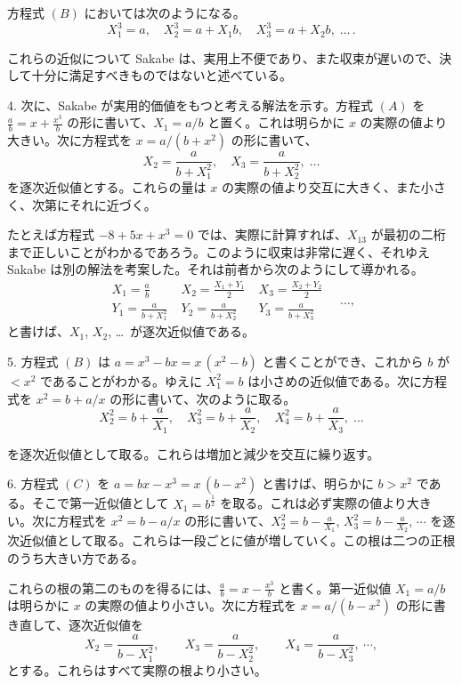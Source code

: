 \documentclass[11pt]{article}
\newcommand{\scanpage}[2]{\clearpage\setcounter{footnote}{0}\noindent{\footnotesize\color{gray}PDF #1 頁 · #2}\par\medskip}
\begin{document}
方程式 $(B)$ においては次のようになる。
\[
X_1^3 = a, \quad X_2^3 = a + X_1b, \quad X_3^3 = a + X_2b, \;\ldots\,.
\]

これらの近似について Sakabe は、実用上不便であり、また収束が遅いので、決して十分に満足すべきものではないと述べている。

4. 次に、Sakabe が実用的価値をもつと考える解法を示す。方程式 $(A)$ を $\frac{a}{b} = x + \frac{x^3}{b}$ の形に書いて、$X_1 = a/b$ と置く。これは明らかに $x$ の実際の値より大きい。次に方程式を $x = a/(b + x^2)$ の形に書いて、
\[
X_2 = \frac{a}{b + X_1^2}, \quad X_3 = \frac{a}{b + X_2^2}, \;\ldots
\]
を逐次近似値とする。これらの量は $x$ の実際の値より交互に大きく、また小さく、次第にそれに近づく。

たとえば方程式 $-8 + 5x + x^3 = 0$ では、実際に計算すれば、$X_{13}$ が最初の二桁まで正しいことがわかるであろう。このように収束は非常に遅く、それゆえ Sakabe は別の解法を考案した。それは前者から次のようにして導かれる。
\[
\begin{array}{l|l|l|}
X_1 = \frac{a}{b} & \;X_2 = \frac{X_1 + Y_1}{2} & \;X_3 = \frac{X_2 + Y_2}{2} \\[3mm]
Y_1 = \frac{a}{b + X_1^2} & \;Y_2 = \frac{a}{b + X_2^2} & \;Y_3 = \frac{a}{b + X_3^2}
\end{array}
\quad \ldots,
\]
と書けば、$X_1$, $X_2$, \ldots\ が逐次近似値である。

5. 方程式 $(B)$ は $a = x^3 - bx = x\,(x^2 - b)$ と書くことができ、これから $b$ が $< x^2$ であることがわかる。ゆえに $X_1^2 = b$ は小さめの近似値である。次に方程式を $x^2 = b + a/x$ の形に書いて、次のように取る。
\[
X_2^2 = b + \frac{a}{X_1}, \quad X_3^2 = b + \frac{a}{X_2}, \quad X_4^2 = b + \frac{a}{X_3}, \;\ldots
\]

\scanpage{0277}{印刷頁 263}
\noindent を逐次近似値として取る。これらは増加と減少を交互に繰り返す。

6. 方程式 $(C)$ を $a = bx - x^3 = x\,(b - x^2)$ と書けば、明らかに $b > x^2$ である。そこで第一近似値として $X_1 = b^{\frac{1}{2}}$ を取る。これは必ず実際の値より大きい。次に方程式を $x^2 = b - a/x$ の形に書いて、$X_2^2 = b - \frac{a}{X_1}$, $X_3^2 = b - \frac{a}{X_2}$, $\cdots$ を逐次近似値として取る。これらは一段ごとに値が増していく。この根は二つの正根のうち大きい方である。

これらの根の第二のものを得るには、$\frac{a}{b} = x - \frac{x^3}{b}$ と書く。第一近似値 $X_1 = a/b$ は明らかに $x$ の実際の値より小さい。次に方程式を $x = a/(b - x^2)$ の形に書き直して、逐次近似値を
\[
X_2 = \frac{a}{b - X_1^2}, \qquad X_3 = \frac{a}{b - X_2^2}, \qquad X_4 = \frac{a}{b - X_3^2}, \ \cdots,
\]
とする。これらはすべて実際の根より小さい。
\end{document}
